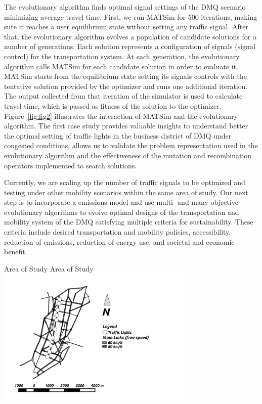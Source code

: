 The evolutionary algorithm finds optimal signal settings of the DMQ scenario minimizing average travel time. First, we run MATSim for 500 iterations, making sure it reaches a user equilibrium state without setting any traffic signal. After that, the evolutionary algorithm evolves a population of candidate solutions for a number of generations. Each solution represents a configuration of signals (signal control) for the transportation system. At each generation, the evolutionary algorithm calls MATSim for each candidate solution in order to evaluate it. MATSim starts from the equilibrium state setting its signals controls with the tentative solution provided by the optimizer and runs one additional iteration. The output collected from that iteration of the simulator is used to calculate travel time, which is passed as
fitness of the solution to the optimizer. Figure~\ref{fig:fig2} illustrates the interaction of MATSim and the evolutionary algorithm. The first case study \citep[][]{ArmasEtAl_SEAL_2014} provides valuable insights to understand better the optimal setting of traffic lights in the business district of DMQ under congested conditions, allows us to validate the problem representation used in the evolutionary algorithm and the effectiveness of the mutation and recombination operators implemented to search solutions.

Currently, we are scaling up the number of traffic signals to be optimized and testing under other mobility scenarios within the same area of study. Our next step is to incorporate a emissions model and use multi- and many-objective evolutionary algorithms \citep[][]{AguireEtAl_EMO_2013} to evolve optimal designs of the transportation and mobility system of the DMQ satisfying multiple criteria for sustainability. These criteria include desired transportation and mobility policies, accessibility, reduction of emissions, reduction of energy use, and societal and economic benefit.

\createfigure%
{Area of Study}%
{Area of Study}%
{\label{fig:fig1}}%
{\includegraphics[width=0.7\textwidth, angle=0]{./using/figures/qfig1.png}}%
{}

